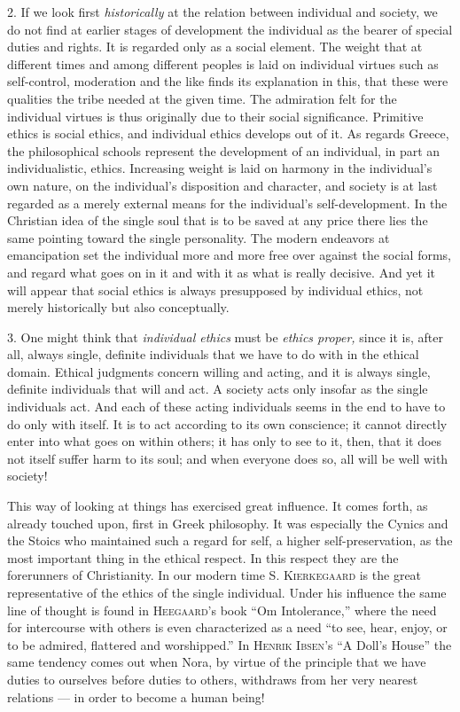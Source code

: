 \documentclass[12pt,a4paper,openany]{book}
\newcommand{\opage}[1]{\marginnote{\footnotesize\textit{[#1]}}}
\begin{document}
2. If we look first \textit{historically} at the relation between individual and society, we do not find at
earlier stages of development the individual as the bearer of special duties and rights. It is regarded only
as a social element. The weight that at different
\opage{161}times and among different peoples is laid on individual virtues such as self-control, moderation and the
like finds its explanation in this, that these were qualities the tribe needed at the given time. The
admiration felt for the individual virtues is thus originally due to their social significance. Primitive
ethics is social ethics, and individual ethics develops out of it. As regards Greece, the philosophical schools
represent the development of an individual, in part an individualistic, ethics. Increasing weight is laid on
harmony in the individual's own nature, on the individual's disposition and character, and society is at
last regarded as a merely external means for the individual's self-development. In the Christian idea of the
single soul that is to be saved at any price there lies the same pointing toward the single personality. The
modern endeavors at emancipation set the individual more and more free over against the social forms, and
regard what goes on in it and with it as what is really decisive. And yet it will appear that social ethics
is always presupposed by individual ethics, not merely historically but also conceptually.

3. One might think that \textit{individual ethics} must be \textit{ethics proper,} since it is, after all,
always single, definite individuals that we have to do with in the ethical domain. Ethical judgments concern
willing and acting, and it is always single, definite individuals that will and act. A society acts only
insofar as the single individuals act. And each of these acting individuals seems in the end to have to do
only with itself. It is to act according to its own conscience; it cannot directly enter into what goes on
within others; it has only to see to it, then, that it does not itself suffer harm to its soul; and when
everyone does so, all will be well with society!

This way of looking at things has exercised great influence. It comes forth, as already touched upon, first
in Greek philosophy. It was especially the Cynics and the Stoics who maintained such a regard for self, a
higher self-preservation, as the most important thing in the ethical respect. In this respect they are the
forerunners of Christianity. In our
\opage{162}modern time S. \textsc{Kierkegaard} is the great representative of the ethics of the single individual.
Under his influence the same line of thought is found in \textsc{Heegaard}'s book ``Om Intolerance,'' where the
need for intercourse with others is even characterized as a need ``to see, hear, enjoy, or to be admired,
flattered and worshipped.'' In \textsc{Henrik Ibsen}'s ``A Doll's House'' the same tendency comes out when
Nora, by virtue of the principle that we have duties to ourselves before duties to others, withdraws from her
very nearest relations --- in order to become a human being!
\end{document}

